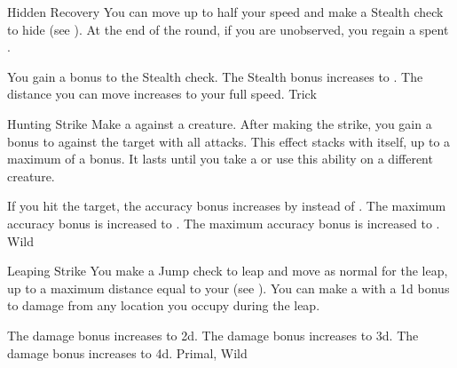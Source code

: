\lowercase{\hypertarget{maneuver:Hidden Recovery}{}}\label{maneuver:Hidden Recovery}
\begin{freeability}{\hypertarget{maneuver:Hidden Recovery}{Hidden Recovery}}
You can move up to half your speed and make a Stealth check to hide (see ).
At the end of the round, if you are unobserved, you regain a spent .

\rankline
{} You gain a  bonus to the Stealth check.
 The Stealth bonus increases to .
 The distance you can move increases to your full speed.
 Trick
\end{freeability}
\vspace{0.25em}



\lowercase{\hypertarget{maneuver:Hunting Strike}{}}\label{maneuver:Hunting Strike}
\begin{freeability}{\hypertarget{maneuver:Hunting Strike}{Hunting Strike}}
Make a  against a creature.
After making the strike, you gain a  bonus to  against the target with all attacks.
This effect stacks with itself, up to a maximum of a  bonus.
It lasts until you take a  or use this ability on a different creature.

\rankline
{} If you hit the target, the accuracy bonus increases by  instead of .
 The maximum accuracy bonus is increased to .
 The maximum accuracy bonus is increased to .
 Wild
\end{freeability}
\vspace{0.25em}



\lowercase{\hypertarget{maneuver:Leaping Strike}{}}\label{maneuver:Leaping Strike}
\begin{apability}{\hypertarget{maneuver:Leaping Strike}{Leaping Strike}}
You make a Jump check to leap and move as normal for the leap, up to a maximum distance equal to your  (see ).
You can make a  with a \plus1d bonus to damage from any location you occupy during the leap.

\rankline
{} The damage bonus increases to \plus2d.
 The damage bonus increases to \plus3d.
 The damage bonus increases to \plus4d.
 Primal, Wild
\end{apability}
\vspace{0.25em}



